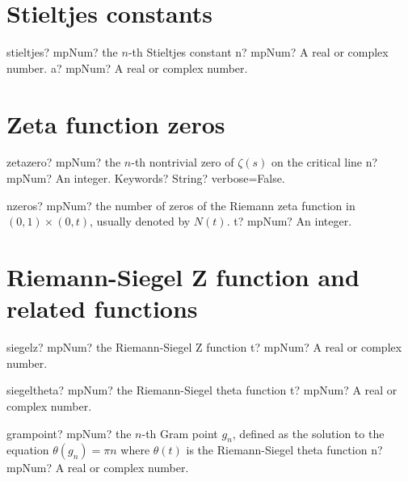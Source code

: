 \documentclass[12pt,a4paper,openany]{book}
\begin{document}
\section{Stieltjes constants}

\begin{mpFunctionsExtract}
\mpFunctionTwo
{stieltjes? mpNum? the $n$-th Stieltjes constant}
{n? mpNum? A real or complex number.}
{a? mpNum? A real or complex number.}
\end{mpFunctionsExtract}

\section{Zeta function zeros}

\begin{mpFunctionsExtract}
\mpFunctionTwo
{zetazero? mpNum? the $n$-th nontrivial zero of $\zeta(s)$ on the critical line}
{n? mpNum? An integer.}
{Keywords? String? verbose=False.}
\end{mpFunctionsExtract}

\begin{mpFunctionsExtract}
\mpFunctionOne
{nzeros? mpNum? the number of zeros of the Riemann zeta function in $(0,1) \times (0,t)$, usually denoted by $N(t)$.}
{t? mpNum? An integer.}
\end{mpFunctionsExtract}

\section{Riemann-Siegel Z function and related functions}

\begin{mpFunctionsExtract}
\mpFunctionOne
{siegelz? mpNum? the Riemann-Siegel Z function}
{t? mpNum? A real or complex number.}
\end{mpFunctionsExtract}

\begin{mpFunctionsExtract}
\mpFunctionOne
{siegeltheta? mpNum? the Riemann-Siegel theta function}
{t? mpNum? A real or complex number.}
\end{mpFunctionsExtract}

\begin{mpFunctionsExtract}
\mpFunctionOne
{grampoint? mpNum? the $n$-th Gram point $g_n$, defined as the solution to the equation $\theta(g_n)=\pi n$ where $\theta(t)$ is the Riemann-Siegel theta function}
{n? mpNum? A real or complex number.}
\end{mpFunctionsExtract}
\end{document}
